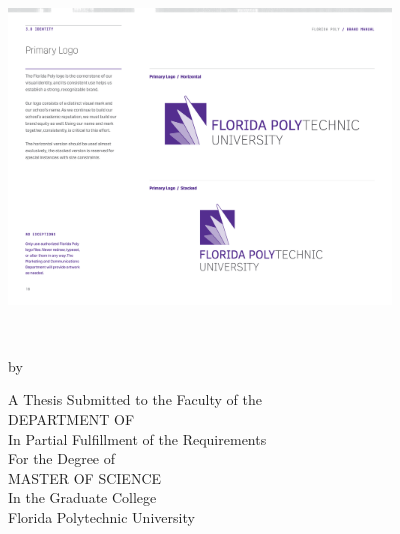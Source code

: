 %
%
%

\begin{center} 
    \includegraphics[width=4in]{Content/Images/FLPoly_logo.pdf}\\\vspace*{25mm}
	{{\bfseries\large{\MakeUppercase{\thesisTitle} \\}}\par}
	\vspace*{15mm}
	{by\\\vspace*{2mm}\textsc{\thesisBy}\par}
	\vspace*{15mm}
	A Thesis Submitted to the Faculty of the \\
	DEPARTMENT OF {\MakeUppercase{\thesisDegreeDepartment}}\\
	In Partial Fulfillment of the Requirements\\
	For the Degree of\\
	MASTER OF SCIENCE\\ 
	In the Graduate College\\\vspace*{1.5mm}
	Florida Polytechnic University\\\vspace*{10mm}
	\small \thesisDate \\\vspace*{1.5mm}
	\vfill
    ~
\end{center}
\pagebreak